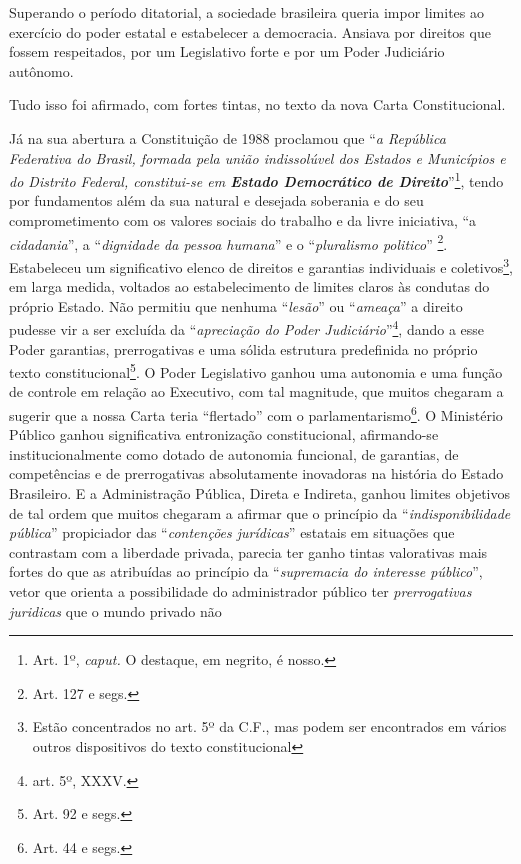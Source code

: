 Superando o período ditatorial, a sociedade brasileira queria impor
limites ao exercício do poder estatal e estabelecer a democracia.
Ansiava por direitos que fossem respeitados, por um Legislativo forte e
por um Poder Judiciário autônomo.

Tudo isso foi afirmado, com fortes tintas, no texto da nova Carta
Constitucional.

Já na sua abertura a Constituição de 1988 proclamou que ``\emph{a
República Federativa do Brasil, formada pela união indissolúvel dos
Estados e Municípios e do Distrito Federal, constitui-se em
\textbf{Estado Democrático de Direito}}''\footnote{Art. 1º,
  \emph{caput.} O destaque, em negrito, é nosso.}, tendo por fundamentos
além da sua natural e desejada soberania e do seu comprometimento com os
valores sociais do trabalho e da livre iniciativa, ``a
\emph{cidadania}'', a ``\emph{dignidade da pessoa humana}'' e o
``\emph{pluralismo politico}'' \footnote{Art. 127 e segs.}. Estabeleceu
um significativo elenco de direitos e garantias individuais e
coletivos\footnote{Estão concentrados no art. 5º da C.F., mas podem ser
  encontrados em vários outros dispositivos do texto constitucional}, em
larga medida, voltados ao estabelecimento de limites claros às condutas
do próprio Estado. Não permitiu que nenhuma ``\emph{lesão}'' ou
``\emph{ameaça}'' a direito pudesse vir a ser excluída da
``\emph{apreciação do Poder Judiciário}''\footnote{art. 5º, XXXV.},
dando a esse Poder garantias, prerrogativas e uma sólida estrutura
predefinida no próprio texto constitucional\footnote{Art. 92 e segs.}. O
Poder Legislativo ganhou uma autonomia e uma função de controle em
relação ao Executivo, com tal magnitude, que muitos chegaram a sugerir
que a nossa Carta teria ``flertado'' com o parlamentarismo\footnote{Art.
  44 e segs.}. O Ministério Público ganhou significativa entronização
constitucional, afirmando-se institucionalmente como dotado de autonomia
funcional, de garantias, de competências e de prerrogativas
absolutamente inovadoras na história do Estado Brasileiro. E a
Administração Pública, Direta e Indireta, ganhou limites objetivos de
tal ordem que muitos chegaram a afirmar que o princípio da
``\emph{indisponibilidade pública}'' propiciador das ``\emph{contenções
jurídicas}'' estatais em situações que contrastam com a liberdade
privada, parecia ter ganho tintas valorativas mais fortes do que as
atribuídas ao princípio da ``\emph{supremacia do interesse público}'',
vetor que orienta a possibilidade do administrador público ter
\emph{prerrogativas juridicas} que o mundo privado não
